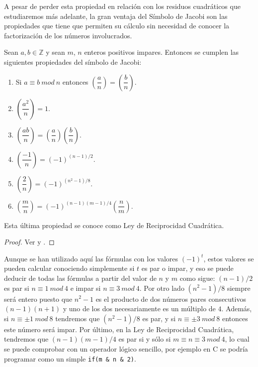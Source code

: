 A pesar de perder esta propiedad en relaci\'on con los residuos cuadr\'aticos que estudiaremos m\'as adelante, la gran ventaja del S\'imbolo de Jacobi son las
propiedades que tiene que permiten su c\'alculo sin necesidad de conocer la factorizaci\'on de los n\'umeros involucrados.

\begin{proposition}
Sean $a,b \in {\mathbb Z}$ y sean $m$, $n$ enteros positivos impares. Entonces se cumplen las siguientes propiedades del s\'imbolo de Jacobi:
\begin{enumerate}
\item Si $a\equiv b~mod~n$ entonces $\left( \dfrac{a}{n} \right) = \left( \dfrac{b}{n} \right)$.
\item $\left( \dfrac{a^2}{n} \right) = 1$.
\item $\left( \dfrac{ab}{n} \right) = \left( \dfrac{a}{n} \right)\left( \dfrac{b}{n} \right)$.
\item $\left( \dfrac{-1}{n} \right) = (-1)^{(n-1)/2}$.
\item $\left( \dfrac{2}{n} \right) = (-1)^{(n^2-1)/8}$.
\item $\left( \dfrac{m}{n} \right) = (-1)^{(n-1)(m-1)/4} \left( \dfrac{n}{m} \right)$.
\end{enumerate}
Esta \'ultima propiedad se conoce como Ley de Reciprocidad Cuadr\'atica.
\end{proposition}
\begin{proof}
Ver \cite[Proposition 2.13]{Pardo} y \cite[Theorem 2.24]{Pardo}.
\end{proof}

\begin{remark}
Aunque se han utilizado aqu\'i las f\'ormulas con los valores $(-1)^t$, estos valores se pueden calcular conociendo simplemente si $t$ es par o impar, y eso se puede deducir
de todas las f\'ormulas a partir del valor de $n$ y $m$ como sigue: $(n-1)/2$ es par si $n \equiv 1~mod~4$ e impar si $n \equiv 3~mod~4$. Por otro lado $(n^2-1)/8$ siempre ser\'a
entero puesto que $n^2-1$ es el producto de dos n\'umeros pares consecutivos $(n-1)(n+1)$ y uno de los dos necesariamente es un m\'ultiplo de $4$. Adem\'as, si $n \equiv \pm 1~mod~8$
tendremos que $(n^2-1)/8$ es par, y si $n \equiv \pm 3 ~mod~ 8$ entonces este n\'umero ser\'a impar. Por \'ultimo, en la Ley de Reciprocidad Cuadr\'atica, tendremos que $(n-1)(m-1)/4$ es
par si y s\'olo si $m \equiv n \equiv 3 ~mod~4$, lo cual se puede comprobar con un operador l\'ogico sencillo, por ejemplo en C se podr\'ia programar como un simple \verb!if(m & n & 2)!.
\end{remark}

